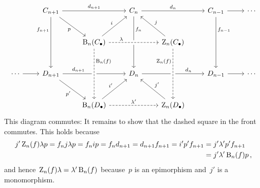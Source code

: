 \begin{remark}
\begin{enumerate}
\[\begin{tikzcd}[row sep = large, column sep = 2.3em]
          & C_{n+1}
            \arrow{rr}[above]{d_{n+1}}
            \arrow{dd}[left, near start]{f_{n+1}}
            \arrow{dr}[below left]{p}
          & {}
          & C_n
            \arrow{rr}[above]{d_n}
            \arrow{dd}[right, near start]{f_n}
          & {}
          & C_{n-1}
            \arrow{r}
            \arrow{dd}[right, near start]{f_{n-1}}
          & \dotsb
          \\
            {}
          & {}
          & \Bl_n(\Ccc)
            \arrow{ur}[above left]{i}
          & {}
          & \Zl_n(\Ccc)
            \arrow{ul}[above right]{j}
            \arrow[from=ll, dashed, crossing over, "\lambda", near start]
          & {}
          & {}
          \\
            \dotsb
            \arrow{r}
          & D_{n+1}
            \arrow{rr}[above, near start]{d_{n+1}}
            \arrow{dr}[below left]{p'}
          & {}
          & D_n
            \arrow{rr}[above, near end]{d_n}
          & {}
          & D_{n-1}
            \arrow{r}
          & \dotsb
          \\
            {}
          & {}
          & \Bl_n(\Dcc)
            \arrow{ur}[above left]{i'}
            \arrow[dashed]{rr}[above]{\lambda'}
            \arrow[from=uu, dashed, crossing over, "\Bl_n(f)", near start]
          & {}
          & \Zl_n(\Dcc)
            \arrow{ul}[above right]{j'}
            \arrow[from=uu, dashed, crossing over, "\Zl_n(f)", swap, near start]
          & {}
          & {}
        \end{tikzcd}
      \]
      This diagram commutes:
      It remains to show that the dashed square in the front commutes.
      This holds because
      \begin{align*}
            j' \operatorname{Z}_n(f) \lambda p
        =  f_n j \lambda p
        =  f_n i p
        =  f_n d_{n+1}
        =  d_{n+1} f_{n+1}
        =  i' p' f_{n+1}
        &=  j' \lambda' p' f_{n+1}  \\
        &=  j' \lambda' \operatorname{B}_n(f) p \,,
      \end{align*}
      and hence~$\operatorname{Z}_n(f) \lambda = \lambda' \operatorname{B}_n(f)$ because~$p$ is an epimorphism and~$j'$ is a monomorphism.
      

\end{enumerate}
\end{remark}
